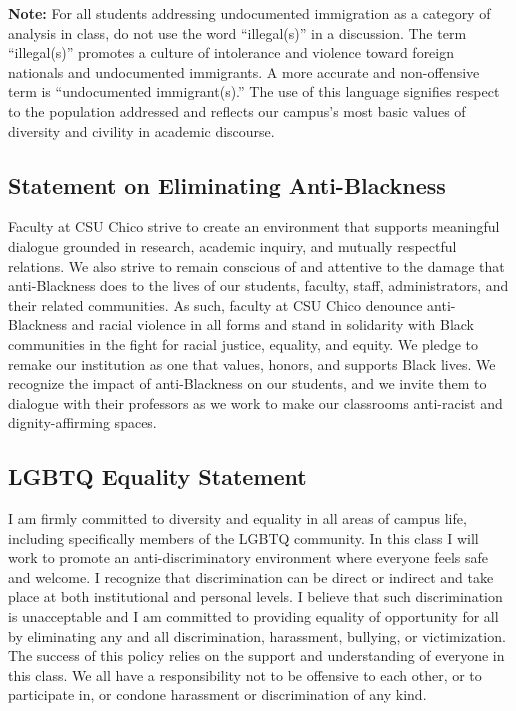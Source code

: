 \documentclass[11pt,]{article}
\begin{document}
\textbf{Note:} For all students addressing undocumented immigration as a
category of analysis in class, do not use the word ``illegal(s)'' in a
discussion. The term ``illegal(s)'' promotes a culture of intolerance
and violence toward foreign nationals and undocumented immigrants. A
more accurate and non-offensive term is ``undocumented immigrant(s).''
The use of this language signifies respect to the population addressed
and reflects our campus's most basic values of diversity and civility in
academic discourse.

\hypertarget{statement-on-eliminating-anti-blackness}{%
\subsection{Statement on Eliminating
Anti-Blackness}\label{statement-on-eliminating-anti-blackness}}

Faculty at CSU Chico strive to create an environment that supports
meaningful dialogue grounded in research, academic inquiry, and mutually
respectful relations. We also strive to remain conscious of and
attentive to the damage that anti-Blackness does to the lives of our
students, faculty, staff, administrators, and their related communities.
As such, faculty at CSU Chico denounce anti-Blackness and racial
violence in all forms and stand in solidarity with Black communities in
the fight for racial justice, equality, and equity. We pledge to remake
our institution as one that values, honors, and supports Black lives. We
recognize the impact of anti-Blackness on our students, and we invite
them to dialogue with their professors as we work to make our classrooms
anti-racist and dignity-affirming spaces.

\hypertarget{lgbtq-equality-statement}{%
\subsection{LGBTQ Equality Statement}\label{lgbtq-equality-statement}}

I am firmly committed to diversity and equality in all areas of campus
life, including specifically members of the LGBTQ community. In this
class I will work to promote an anti-discriminatory environment where
everyone feels safe and welcome. I recognize that discrimination can be
direct or indirect and take place at both institutional and personal
levels. I believe that such discrimination is unacceptable and I am
committed to providing equality of opportunity for all by eliminating
any and all discrimination, harassment, bullying, or victimization. The
success of this policy relies on the support and understanding of
everyone in this class. We all have a responsibility not to be offensive
to each other, or to participate in, or condone harassment or
discrimination of any kind.
\end{document}
